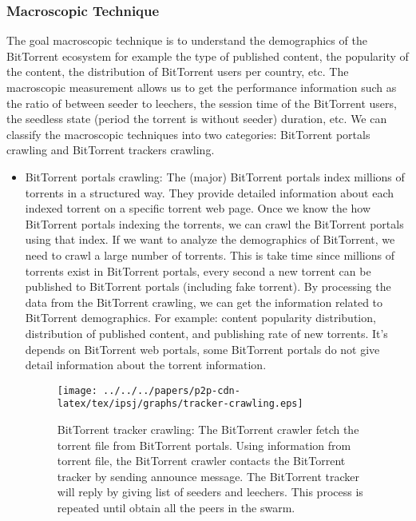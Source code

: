 \subsubsection{Macroscopic Technique}
The goal macroscopic technique is to understand the demographics of the BitTorrent ecosystem for example the type of published content, the popularity of the content, the distribution of BitTorrent users per country, etc. 
The macroscopic measurement allows us to get the performance information such as the ratio of between seeder to leechers, the session time of the BitTorrent users, the seedless state (period the torrent is without seeder) duration, etc.
We can classify the macroscopic techniques into two categories: BitTorrent portals crawling and BitTorrent trackers crawling.

\begin{itemize}
\item BitTorrent portals crawling: 
The (major) BitTorrent portals index millions of torrents in a structured way. 
They provide detailed information about each indexed torrent on a specific torrent web page. 
Once we know the how BitTorrent portals indexing the torrents, we can crawl the BitTorrent portals using that index.
If we want to analyze the demographics of BitTorrent, we need to crawl a large number of torrents.
This is take time since millions of torrents exist in BitTorrent portals, every second a new torrent can be published to BitTorrent portals (including fake torrent).
By processing the data from the BitTorrent crawling, we can get the information related to BitTorrent demographics.
For example: content popularity distribution, distribution of published content, and publishing rate of new torrents.
It's depends on BitTorrent web portals, some BitTorrent portals do not give detail information about the torrent information. 

\begin{figure}[tb]
\begin{center}
\texttt{[image: ../../../papers/p2p-cdn-latex/tex/ipsj/graphs/tracker-crawling.eps]}
\end{center}
\caption{BitTorrent tracker crawling: The BitTorrent crawler fetch the torrent file from BitTorrent portals. Using information from torrent file, the BitTorrent crawler contacts the BitTorrent tracker by sending announce message. The BitTorrent tracker will reply by giving list of seeders and leechers. This process is repeated until obtain all the peers in the swarm.} 
\label{fig:trackercrawling}
\end{figure}



\end{itemize}
